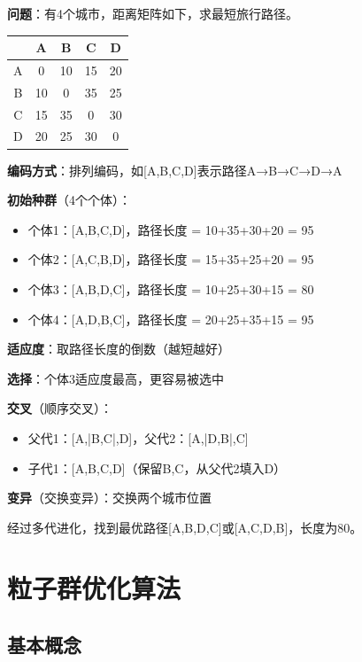 \begin{examplebox}[例题4.2 遗传算法解决TSP问题]
\textbf{问题}：有4个城市，距离矩阵如下，求最短旅行路径。
\begin{center}
\begin{tabular}{c|cccc}
 & A & B & C & D \\
\hline
A & 0 & 10 & 15 & 20 \\
B & 10 & 0 & 35 & 25 \\
C & 15 & 35 & 0 & 30 \\
D & 20 & 25 & 30 & 0 \\
\end{tabular}
\end{center}
\tcblower
\textbf{编码方式}：排列编码，如[A,B,C,D]表示路径A→B→C→D→A

\textbf{初始种群}（4个个体）：
\begin{itemize}[itemsep=0pt]
    \item 个体1：[A,B,C,D]，路径长度 = 10+35+30+20 = 95
    \item 个体2：[A,C,B,D]，路径长度 = 15+35+25+20 = 95
    \item 个体3：[A,B,D,C]，路径长度 = 10+25+30+15 = 80
    \item 个体4：[A,D,B,C]，路径长度 = 20+25+35+15 = 95
\end{itemize}

\textbf{适应度}：取路径长度的倒数（越短越好）

\textbf{选择}：个体3适应度最高，更容易被选中

\textbf{交叉}（顺序交叉）：
\begin{itemize}[itemsep=0pt]
    \item 父代1：[A,|B,C|,D]，父代2：[A,|D,B|,C]
    \item 子代1：[A,B,C,D]（保留B,C，从父代2填入D）
\end{itemize}

\textbf{变异}（交换变异）：交换两个城市位置

经过多代进化，找到最优路径[A,B,D,C]或[A,C,D,B]，长度为80。
\end{examplebox}


\section{粒子群优化算法}

\subsection{基本概念}

